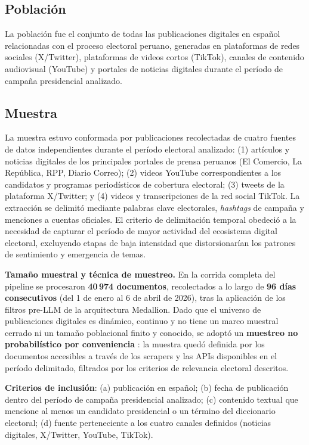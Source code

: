 \subsection{Población}
 
La población fue el conjunto de todas las publicaciones digitales en español relacionadas con el proceso electoral peruano, generadas en plataformas de redes sociales (X/Twitter), plataformas de videos cortos (TikTok), canales de contenido audiovisual (YouTube) y portales de noticias digitales durante el período de campaña presidencial analizado.
 
\subsection{Muestra}

La muestra estuvo conformada por publicaciones recolectadas de cuatro fuentes de datos independientes durante el período electoral analizado: (1) artículos y noticias digitales de los principales portales de prensa peruanos (El Comercio, La República, RPP, Diario Correo); (2) videos YouTube correspondientes a los candidatos y programas periodísticos de cobertura electoral; (3) tweets de la plataforma X/Twitter; y (4) videos y transcripciones de la red social TikTok. La extracción se delimitó mediante palabras clave electorales, \textit{hashtags} de campaña y menciones a cuentas oficiales. El criterio de delimitación temporal obedeció a la necesidad de capturar el período de mayor actividad del ecosistema digital electoral, excluyendo etapas de baja intensidad que distorsionarían los patrones de sentimiento y emergencia de temas.

\textbf{Tamaño muestral y técnica de muestreo.} En la corrida completa del pipeline se procesaron \textbf{40\,974 documentos}, recolectados a lo largo de \textbf{96 días consecutivos} (del 1 de enero al 6 de abril de 2026), tras la aplicación de los filtros pre-LLM de la arquitectura Medallion. Dado que el universo de publicaciones digitales es dinámico, continuo y no tiene un marco muestral cerrado ni un tamaño poblacional finito y conocido, se adoptó un \textbf{muestreo no probabilístico por conveniencia} \parencite{bk_hernandez2014metodologia}: la muestra quedó definida por los documentos accesibles a través de los scrapers y las APIs disponibles en el período delimitado, filtrados por los criterios de relevancia electoral descritos.

\textbf{Criterios de inclusión}: (a) publicación en español; (b) fecha de publicación dentro del período de campaña presidencial analizado; (c) contenido textual que mencione al menos un candidato presidencial o un término del diccionario electoral; (d) fuente perteneciente a los cuatro canales definidos (noticias digitales, X/Twitter, YouTube, TikTok).

